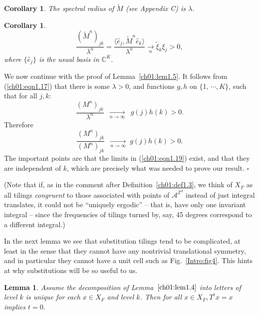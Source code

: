 \documentclass[reqno]{stml-l}
\theoremstyle{plain}
\newtheorem{lemma}[theorem]{Lemma}
\newtheorem{corollary}[theorem]{Corollary}
\theoremstyle{definition}
\numberwithin{equation}{chapter}
\begin{document}
\begin{corollary}\label{ch01:cor1.7}
The spectral radius of $\tilde{M}$ (see Appendix C) \emph{is} $\lambda$.
\end{corollary}

\begin{corollary}\label{ch01:cor1.8}
\begin{equation}
\frac{(\tilde{M}^{n})_{jk}}{\lambda^{n}}=\frac{\langle\hat{e}_{j},\tilde{M}^{n}\hat{e}_{k}\rangle}{\lambda^{n}}\underset{n}{\xrightarrow{\quad}}\tilde{\xi}_{k}\xi_{j}>0,\label{ch01:eqn1.17}
\end{equation}
where $\{\hat{e}_{j}\}$ is the usual basis in $\mathbb{C}^{K}$.
\end{corollary}

We now continue with the proof of Lemma~\ref{ch01:lem1.5}. It follows from (\ref{ch01:eqn1.17}) that there is some $\lambda>0$, and functions $g,h$ on $\{$1, $\cdots,K\}$, such that for all $j,k$:
\begin{equation}\label{ch01:eqn1.18}
\frac{(M^{n})_{jk}}{\lambda^{n}}\ \underset{n\rightarrow\infty}{\xrightarrow{\qquad\qquad}}\ g(j)h(k)>0.
\end{equation}
Therefore
\begin{equation}\label{ch01:eqn1.19}
\frac{(M^{n})_{jk}}{(M^{n})_{jk}}\ \underset{n\rightarrow\infty}{\xrightarrow{\qquad\qquad}}
g(j)h(k)>0.
\end{equation}
The important points are that the limits in (\ref{ch01:eqn1.19}) exist, and that they are independent of $k$, which are precisely what was needed to prove our result. \hfill$\square$

(Note that if, as in the comment after Definition~\ref{ch01:def1.3}, we think of $X_{F}$ as all tilings \emph{congruent} to those associated with points of $\mathcal{A}^{\mathbb{Z}^{d}}$ instead of just integral translates, it could not be ``uniquely ergodic'' -- that is, have only one invariant integral -- since the frequencies of tilings turned by, say, 45 degrees correspond to a different integral.)

In the next lemma we see that substitution tilings tend to be complicated, at least in the sense that they cannot have any nontrivial translational symmetry, and in particular they cannot have a unit cell such as Fig.~\ref{Intro:fig4}. This hints at why substitutions will be so useful to us.

\begin{lemma}\label{ch01:lem1.9}
Assume the decomposition of Lemma~$\ref{ch01:lem1.4}$ into letters of level $k$ is unique for each $x\in X_{F}$ and level $k$. Then for all $x\in X_{F},T^{t}x=x$ implies $t=0$.
\end{lemma}
\end{document}
